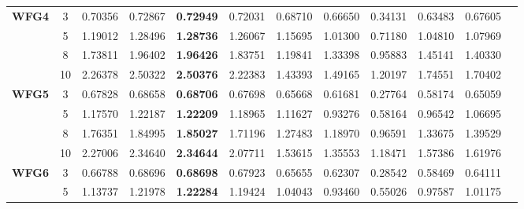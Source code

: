 \documentclass{sig-alternate}
\begin{document}
\begin{table}[!htb]
\begin{tabular}{|c|c|c|c|c|c|c|c|c|c|c|c|}
		\multirow{4}{*}{\textbf{WFG4}}  & 3          & 0.70356          & 0.72867           & \textbf{0.72949}      & 0.72031          & 0.68710             & 0.66650             & 0.34131            & 0.63483              & 0.67605          \\ \cline{2-11} 
		& 5          & 1.19012          & 1.28496           & \textbf{1.28736}      & 1.26067          & 1.15695             & 1.01300             & 0.71180            & 1.04810              & 1.07969          \\ \cline{2-11} 
		& 8          & 1.73811          & 1.96402           & \textbf{1.96426}      & 1.83751          & 1.19841             & 1.33398             & 0.95883            & 1.45141              & 1.40330          \\ \cline{2-11} 
		& 10         & 2.26378          & 2.50322           & \textbf{2.50376}      & 2.22383          & 1.43393             & 1.49165             & 1.20197            & 1.74551              & 1.70402          \\ \hline
		\multirow{4}{*}{\textbf{WFG5}}  & 3          & 0.67828          & 0.68658           & \textbf{0.68706}      & 0.67698          & 0.65668             & 0.61681             & 0.27764            & 0.58174              & 0.65059          \\ \cline{2-11} 
		& 5          & 1.17570          & 1.22187           & \textbf{1.22209}      & 1.18965          & 1.11627             & 0.93276             & 0.58164            & 0.96542              & 1.06695          \\ \cline{2-11} 
		& 8          & 1.76351          & 1.84995           & \textbf{1.85027}      & 1.71196          & 1.27483             & 1.18970             & 0.96591            & 1.33675              & 1.39529          \\ \cline{2-11} 
		& 10         & 2.27006          & 2.34640           & \textbf{2.34644}      & 2.07711          & 1.53615             & 1.35553             & 1.18471            & 1.57386              & 1.61976          \\ \hline
		\multirow{4}{*}{\textbf{WFG6}}  & 3          & 0.66788          & 0.68696           & \textbf{0.68698}      & 0.67923          & 0.65655             & 0.62307             & 0.28542            & 0.58469              & 0.64111          \\ \cline{2-11} 
		& 5          & 1.13737          & 1.21978           & \textbf{1.22284}      & 1.19424          & 1.04043             & 0.93460             & 0.55026            & 0.97587              & 1.01175          \\ \cline{2-11} 

\end{tabular}
\end{table}
\end{document}
